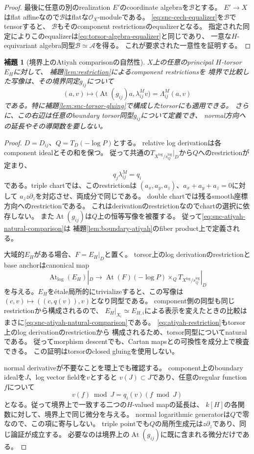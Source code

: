 \documentclass[uplatex,dvipdfmx,11pt]{jsarticle}
\numberwithin{equation}{section}
\theoremstyle{plain}
\newtheorem{lemma}[theorem]{補題}
\theoremstyle{definition}
\theoremstyle{remark}
\DeclareMathOperator{\At}{At}
\newcommand{\OO}{\mathcal O}
\newcommand{\Tlog}{T_{X^{\log}/s_Q^{\log}}}
\newcommand{\Atlog}{\At_{\log}}
\begin{document}
\begin{proof}
最後に任意の別のrealization $E'$のcoordinate algebraを$\mathcal B$とする。
$E'\to X$はflat affineなので$\mathcal B$はflatな$\OO_X$-moduleである。
\eqref{eq:snc-cech-equalizer}を$\mathcal B$でtensorすると、
$\mathcal B$もそのcomponent restrictionsのequalizerとなる。
指定された同定によりこのequalizerは\eqref{eq:torsor-algebra-equalizer}と同じであり、
一意な$H$-equivariant algebra同型$\mathcal B\simeq\mathcal A$を得る。
これが要求された一意性を証明する。
\end{proof}

\begin{lemma}[境界上のAtiyah comparisonの自然性]
\label{lem:snc-atiyah-comparison}
$X$上の任意のprincipal $H$-torsor $E_H$に対して、
補題\ref{lem:restriction}によるcomponent restrictionsを
境界で比較した写像は、その境界同定$g_{ij}$について
\begin{equation}\label{eq:snc-atiyah-natural-comparison}
(a,v)\longmapsto
\bigl(\At(g_{ij})a,\lambda^M_{ij}v\bigr)
=\Lambda^M_{ij}(a,v)
\end{equation}
である。特に補題\ref{lem:snc-torsor-gluing}で構成したtorsorにも適用できる。
さらに、この右辺は任意のboundary torsor同型$g_{ij}$について定義でき、
normal方向への延長やその導関数を要しない。
\end{lemma}

\begin{proof}
$D=D_{ij}$、$Q=T_D(-\log P)$とする。
relative log derivationは各component idealとその和を保つ。
従って共通の$\Tlog|_D$から$Q$へのrestrictionが定まり、
\[
q_j\lambda^M_{ij}=q_i
\]
である。triple chartでは、このrestrictionは
$(a_x,a_y,a_z)$、$a_x+a_y+a_z=0$に対して
$a_z z\partial_z$を対応させ、両成分で同じである。
double chartでは残るsmooth座標方向へのrestrictionである。
これはderivationのrestrictionなのでchartの選択に依存しない。
また$\At(g_{ij})$は$Q$上の恒等写像を被覆する。
従って\eqref{eq:snc-atiyah-natural-comparison}は
補題\ref{lem:boundary-atiyah}のfiber product上で定義される。

大域的$E_H$がある場合、$F=E_H|_D$と置く。
torsor上のlog derivationのrestrictionとbase anchorはcanonical map
\[
\Atlog(E_H)|_D\longrightarrow
\At(F)(-\log P)\times_Q\Tlog|_D
\]
を与える。$E_H$をétale局所的にtrivializeすると、この写像は
$(c,v)\mapsto((c,q(v)),v)$となり同型である。
component側の同型も同じrestrictionから構成されるので、
$E_H|_{X_i}\simeq E_{H,i}$による表示を変えたときの比較は
まさに\eqref{eq:snc-atiyah-natural-comparison}である。
\eqref{eq:atiyah-restriction}もtorsor上のlog derivationのrestrictionから
構成されるため、torsor同型についてnaturalである。
従ってmorphism descentでも、Cartan mapsとの可換性を成分上で検査できる。
この証明はtorsorのclosed gluingを使用しない。

normal derivativeが不要なことを環上でも確認する。
component上のboundary idealを$J$、log vector fieldを$v$とすると
$v(J)\subset J$であり、任意のregular function $f$について
\[
v(f)\bmod J=q_i(v)(f\bmod J)
\]
となる。従って境界上で一致する二つの$H$-valued mapの延長は、
$k[H]$の各関数に対して、境界上で同じ微分を与える。
normal logarithmic generatorは$Q$で零なので、この項に寄与しない。
triple pointでも$Q$の局所生成元は$z\partial_z$であり、同じ論証が成立する。
必要なのは境界上の$\At(g_{ij})$に既に含まれる微分だけである。
\end{proof}
\end{document}
